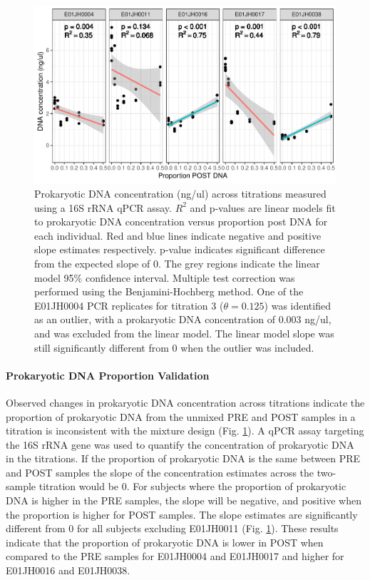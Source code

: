 \documentclass[12pt]{article}
\begin{document}
\begin{figure}
\centering
\includegraphics[width=0.9\linewidth]{bacPlot-1.pdf}
\caption{\label{fig:bacPlot}Prokaryotic DNA concentration (ng/ul) across
titrations measured using a 16S rRNA qPCR assay. \(R^2\) and p-values are linear
models fit to prokaryotic DNA concentration versus proportion post DNA for each individual.
Red and blue lines indicate negative and positive slope estimates respectively.
p-value indicates significant difference from the expected slope of 0.
The grey regions indicate the linear model 95\% confidence interval.
Multiple test correction was performed using the Benjamini-Hochberg
method. One of the E01JH0004 PCR replicates for titration 3
(\(\theta=0.125\)) was identified as an outlier, with a prokaryotic DNA
concentration of 0.003 ng/ul, and was excluded from the linear model.
The linear model slope was still significantly different from 0 when the
outlier was included.}
\end{figure}

\paragraph*{Prokaryotic DNA Proportion Validation}
Observed changes in prokaryotic DNA concentration across titrations
indicate the proportion of prokaryotic DNA from the unmixed PRE and POST
samples in a titration is inconsistent with the mixture design (Fig.
\ref{fig:bacPlot}). A qPCR assay targeting the 16S rRNA gene was used to
quantify the concentration of prokaryotic DNA in the titrations. If the
proportion of prokaryotic DNA is the same between PRE and POST samples
the slope of the concentration estimates across the two-sample titration
would be 0. For subjects where the proportion of prokaryotic DNA is
higher in the PRE samples, the slope will be negative, and positive when
the proportion is higher for POST samples. The slope estimates are
significantly different from 0 for all subjects excluding E01JH0011
(Fig. \ref{fig:bacPlot}). These results indicate that the proportion of
prokaryotic DNA is lower in POST when compared to the PRE samples for
E01JH0004 and E01JH0017 and higher for E01JH0016 and E01JH0038.
\end{document}
